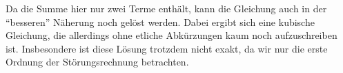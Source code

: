 \documentclass[english, parskip=full]{scrartcl}
\newcommand{\kla}{}
\begin{document}
Da die Summe hier nur zwei Terme enthält, kann die Gleichung auch in der ``besseren'' Näherung noch gelöst werden.
Dabei ergibt sich eine kubische Gleichung, die allerdings ohne etliche Abkürzungen kaum noch aufzuschreiben ist.
Insbesondere ist diese Lösung trotzdem nicht exakt, da wir nur die erste Ordnung der Störungsrechnung betrachten.
\end{document}
